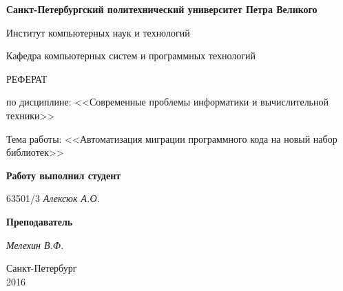\begin{titlepage}
\begin{center}

\textbf{Санкт-Петербургский политехнический университет Петра Великого}

\vspace{5mm}
Институт компьютерных наук и технологий

\vspace{5mm}
Кафедра компьютерных систем и программных технологий

\vspace*{\fill}

\huge{РЕФЕРАТ}

\large{по дисциплине: <<Современные проблемы информатики и вычислительной техники>>}

\vspace*{2mm}
\large{Тема работы: <<Автоматизация миграции программного кода на новый набор библиотек>>}

\vspace*{\fill}
\end{center}

\begin{large}
\hspace{0.4\linewidth} \textbf{Работу выполнил студент}

\vspace{5mm}
\hspace{0.4\linewidth} 63501/3 \hspace{5mm} \textit{Алексюк А.О.}

\vspace{3mm}
\hspace{0.4\linewidth} \textbf{Преподаватель}

\vspace{5mm}
\hspace{0.4\linewidth} \underline{\hspace{2cm} } \hspace{3mm} \textit{Мелехин В.Ф.}
\end{large}

\vspace*{3cm}

\begin{center}
\normalsize Санкт-Петербург\\2016
\end{center}
\end{titlepage}